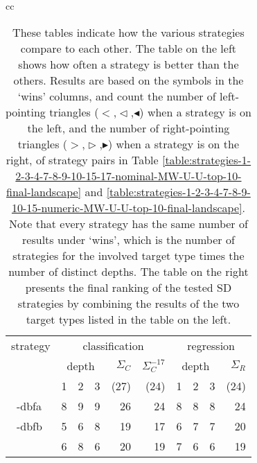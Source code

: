 \documentclass[smallextended]{svjour3}
\newcommand{\dbfa}[1]{1-dbfa}
\newcommand{\dbfb}[1]{2-dbfb}
\newcommand{\dbca}[1]{\ifthenelse{\equal{#1}{0}}{3-dbca}{3-dbca\textsuperscript{#1}}}
\newcommand{\sd}{SD}
\newcommand{\lmix}{$<$}                   %
\newcommand{\lall}{$\vartriangleleft$}    %
\newcommand{\lasi}{$\blacktriangleleft$}  %
\newcommand{\rmix}{$>$}                   %
\newcommand{\rall}{$\vartriangleright$}   %
\newcommand{\rasi}{$\blacktriangleright$} %
\begin{document}
\begin{table}[!hb]
\centering
\caption{These tables indicate how the various strategies compare to each other.
The table on the left shows how often a strategy is better than the others.
Results are based on the symbols in the `wins' columns, and count the number of left-pointing triangles (\lmix,\lall,\lasi) when a strategy is on the left, and the number of right-pointing triangles (\rmix,\rall,\rasi) when a strategy is on the right, of strategy pairs in Table \ref{table:strategies-1-2-3-4-7-8-9-10-15-17-nominal-MW-U-U-top-10-final-landscape} and \ref{table:strategies-1-2-3-4-7-8-9-10-15-numeric-MW-U-U-top-10-final-landscape}.
Note that every strategy has the same number of results under `wins', which is the number of strategies for the involved target type times the number of distinct depths.
The table on the right presents the final ranking of the tested \sd{} strategies by combining the results of the two target types listed in the table on the left.
}
\label{table:mwu-wins}
\begin{tabular}{cc}
\begin{tabular}{l|rrrrr|rrrr}
strategy     & \multicolumn{5}{c|}{classification} & \multicolumn{4}{c}{regression}\\
             & \multicolumn{3}{c}{depth} & $\Sigma_{C}$   & $\Sigma_{C}^{-17}$ & \multicolumn{3}{c}{depth} & $\Sigma_{R}$\\
             & 1 & 2 & 3 & (27) & (24) & 1 & 2 & 3 & (24)\\
\hline
~\:\dbfa{0}  & 8 & 9 & 9 & 26   &   24 & 8 & 8 & 8 & 24\\
~\:\dbfb{0}  & 5 & 6 & 8 & 19   &   17 & 6 & 7 & 7 & 20\\
~\:\dbca{0}  & 6 & 8 & 6 & 20   &   19 & 7 & 6 & 6 & 19\\

\end{tabular}
\end{tabular}
\end{table}
\end{document}
